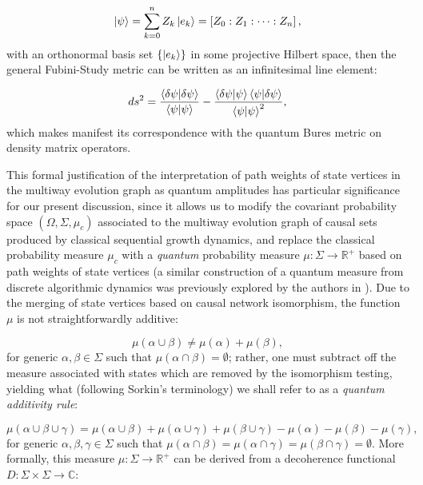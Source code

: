 \documentclass{article}
\begin{document}
\begin{equation}
\ket{\psi} = \sum_{k = 0}^{n} Z_k \ket{e_k} = \left[ Z_0 : Z_1 : \cdots : Z_n \right],
\end{equation}
with an orthonormal basis set ${\left\lbrace \ket{e_k} \right\rbrace}$ in some projective Hilbert space, then the general Fubini-Study metric can be written as an infinitesimal line element:

\begin{equation}
ds^2 = \frac{\braket{\delta \psi}{\delta \psi}}{\braket{\psi}{\psi}} - \frac{\braket{\delta \psi}{\psi} \braket{\psi}{\delta \psi}}{\braket{\psi}{\psi}^2},
\end{equation}
which makes manifest its correspondence with the quantum Bures metric on density matrix operators.

This formal justification of the interpretation of path weights of state vertices in the multiway evolution graph as quantum amplitudes has particular significance for our present discussion, since it allows us to modify the covariant probability space ${\left( \Omega, \Sigma, \mu_c \right)}$ associated to the multiway evolution graph of causal sets produced by classical sequential growth dynamics, and replace the classical probability measure ${\mu_c}$ with a \textit{quantum} probability measure ${\mu : \Sigma \to \mathbb{R}^{+}}$ based on path weights of state vertices (a similar construction of a quantum measure from discrete algorithmic dynamics was previously explored by the authors in \cite{shah}). Due to the merging of state vertices based on causal network isomorphism, the function ${\mu}$ is not straightforwardly additive:

\begin{equation}
\mu \left( \alpha \cup \beta \right) \neq \mu \left( \alpha \right) + \mu \left( \beta \right),
\end{equation}
for generic ${\alpha, \beta \in \Sigma}$ such that ${\mu \left( \alpha \cap \beta \right) = \emptyset}$; rather, one must subtract off the measure associated with states which are removed by the isomorphism testing, yielding what (following Sorkin's terminology\cite{sorkin4}\cite{sorkin5}) we shall refer to as a \textit{quantum additivity rule}:

\begin{equation}
\mu \left( \alpha \cup \beta \cup \gamma \right) = \mu \left( \alpha \cup \beta \right) + \mu \left( \alpha \cup \gamma \right) + \mu \left( \beta \cup \gamma \right) - \mu \left( \alpha \right) - \mu \left( \beta \right) - \mu \left( \gamma \right),
\end{equation}
for generic ${\alpha, \beta, \gamma \in \Sigma}$ such that ${\mu \left( \alpha \cap \beta \right) = \mu \left( \alpha \cap \gamma \right) = \mu \left( \beta \cap \gamma \right) = \emptyset}$. More formally, this measure ${\mu : \Sigma \to \mathbb{R}^{+}}$ can be derived from  a decoherence functional ${D : \Sigma \times \Sigma \to \mathbb{C}}$\cite{salgado}\cite{sorkin6}:
\end{document}
